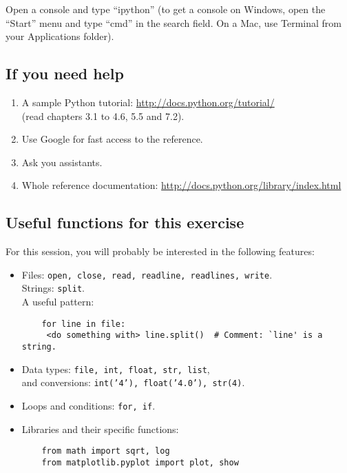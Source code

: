 \documentclass[a4paper,11pt]{article}
\begin{document}
Open a console and type ``ipython''
(to get a console on Windows, open the ``Start'' menu and type ``cmd'' in the search field. On a Mac, use Terminal 
from your Applications folder).

\subsection{If you need help}
\begin{enumerate}
\item A sample Python tutorial: \url{http://docs.python.org/tutorial/} \\(read chapters 3.1 to 4.6, 5.5 and 7.2).
\item Use Google for fast access to the reference.
\item Ask you assistants.
\item Whole reference documentation: \url{http://docs.python.org/library/index.html}
\end{enumerate}

\subsection{Useful functions for this exercise}
For this session, you will probably be interested in the following features:
\begin{itemize}
\item Files: \texttt{open, close, read, readline, readlines, write}.\\
      Strings: \texttt{split}. \\
      A useful pattern:
	\begin{verbatim}
	for line in file:
     <do something with> line.split()  # Comment: `line' is a string.
	\end{verbatim}
\item Data types: \texttt{file, int, float, str, list}, \\
	  	and conversions: \texttt{int('4'), float('4.0'), str(4)}.
\item Loops and conditions: \texttt{for, if}.
\item Libraries and their specific functions: 
	\begin{verbatim}
	from math import sqrt, log
	from matplotlib.pyplot import plot, show
	\end{verbatim}
\end{itemize}
\end{document}

